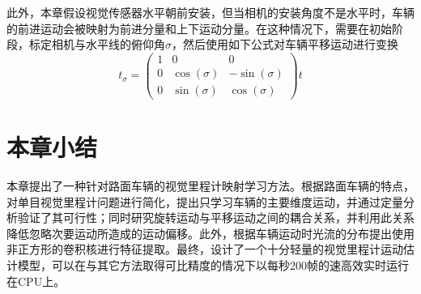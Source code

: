 此外，本章假设视觉传感器水平朝前安装，但当相机的安装角度不是水平时，车辆的前进运动会被映射为前进分量和上下运动分量。在这种情况下，需要在初始阶段，标定相机与水平线的俯仰角$\sigma$，然后使用如下公式对车辆平移运动进行变换
\begin{equation}
    t_\sigma = \begin{pmatrix} 1 & 0 & 0 \\ 0 & \cos(\sigma) & -\sin(\sigma)\\ 0 & \sin(\sigma) & \cos(\sigma) \end{pmatrix} t
    \label{eq:pitch_correction}
\end{equation}

\section{本章小结}
\label{sec:datavo_conclusion}

本章提出了一种针对路面车辆的视觉里程计映射学习方法。根据路面车辆的特点，对单目视觉里程计问题进行简化，提出只学习车辆的主要维度运动，并通过定量分析验证了其可行性；同时研究旋转运动与平移运动之间的耦合关系，并利用此关系降低忽略次要运动所造成的运动偏移。此外，根据车辆运动时光流的分布提出使用非正方形的卷积核进行特征提取。最终，设计了一个十分轻量的视觉里程计运动估计模型，可以在与其它方法取得可比精度的情况下以每秒200帧的速高效实时运行在CPU上。




